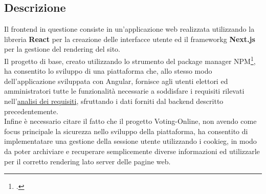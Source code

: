 \subsection{Descrizione}
Il \gls{frontend} in questione consiste in un'applicazione web realizzata utilizzando la libreria \textbf{React} per la creazione delle interfacce utente ed il \gls{frameworkg} \textbf{Next.js} per la gestione del rendering del sito. \\
Il progetto di base, creato utilizzando lo strumento  del package manager NPM\footcite{npm}, ha consentito lo sviluppo di una piattaforma che, allo stesso modo dell'applicazione sviluppata con Angular, fornisce agli utenti elettori ed amministratori tutte le funzionalità necessarie a soddisfare i requisiti rilevati nell'\hyperref[cap:analisi-requisiti]{analisi dei requisiti}, sfruttando i dati forniti dal \gls{backend} descritto precedentemente. \\
Infine è necessario citare il fatto che il progetto Voting-Online, non avendo come focus principale la sicurezza nello sviluppo della piattaforma, ha consentito di implementatare una gestione della sessione utente utilizzando i \gls{cookieg}, in modo da poter archiviare e recuperare semplicemente diverse informazioni ed utilizzarle per il corretto rendering lato server delle pagine web.

